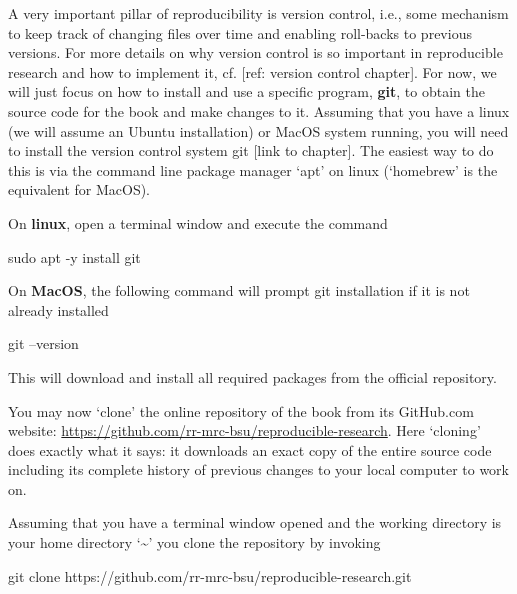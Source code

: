 \documentclass[]{book}
\newenvironment{Shaded}{\begin{snugshade}}{\end{snugshade}}
\newcommand{\FunctionTok}[1]{\textcolor[rgb]{0.00,0.00,0.00}{#1}}
\newcommand{\NormalTok}[1]{#1}
\begin{document}
A very important pillar of reproducibility is version control, i.e.,
some mechanism to keep track of changing files over time and enabling
roll-backs to previous versions. For more details on why version control
is so important in reproducible research and how to implement it, cf.
{[}ref: version control chapter{]}. For now, we will just focus on how
to install and use a specific program, \textbf{git}, to obtain the
source code for the book and make changes to it. Assuming that you have
a linux (we will assume an Ubuntu installation) or MacOS system running,
you will need to install the version control system git {[}link to
chapter{]}. The easiest way to do this is via the command line package
manager `apt' on linux (`homebrew' is the equivalent for MacOS).

On \textbf{linux}, open a terminal window and execute the command

\begin{Shaded}
\begin{Highlighting}[]
\FunctionTok{sudo}\NormalTok{ apt -y install git}
\end{Highlighting}
\end{Shaded}

On \textbf{MacOS}, the following command will prompt git installation if
it is not already installed

\begin{Shaded}
\begin{Highlighting}[]
\FunctionTok{git}\NormalTok{ --version}
\end{Highlighting}
\end{Shaded}

This will download and install all required packages from the official
repository.

You may now `clone' the online repository of the book from its
GitHub.com website:
\url{https://github.com/rr-mrc-bsu/reproducible-research}. Here
`cloning' does exactly what it says: it downloads an exact copy of the
entire source code including its complete history of previous changes to
your local computer to work on.

Assuming that you have a terminal window opened and the working
directory is your home directory `\textasciitilde{}' you clone the
repository by invoking

\begin{Shaded}
\begin{Highlighting}[]
\FunctionTok{git}\NormalTok{ clone https://github.com/rr-mrc-bsu/reproducible-research.git}
\end{Highlighting}
\end{Shaded}
\end{document}
